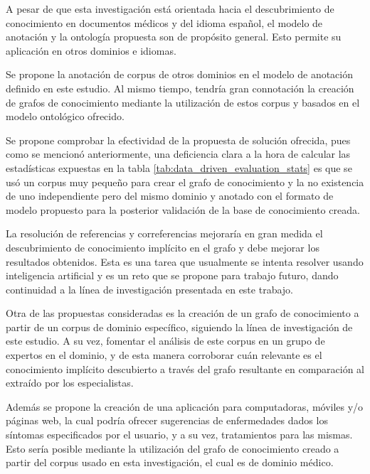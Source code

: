 \label{chapter:recommendations}

A pesar de que esta investigación está orientada hacia el descubrimiento de conocimiento en documentos médicos y del idioma español, el modelo de anotación y la ontología propuesta son de propósito general. Esto permite su aplicación en otros dominios e idiomas.

Se propone la anotación de corpus de otros dominios en el modelo de anotación definido en este estudio. Al mismo tiempo, tendría gran connotación la creación de grafos de conocimiento mediante la utilización de estos corpus y basados en el modelo ontológico ofrecido.

Se propone comprobar la efectividad de la propuesta de solución ofrecida, pues como se mencionó anteriormente, una deficiencia clara a la hora de calcular las estadísticas expuestas en la tabla \ref{tab:data_driven_evaluation_stats} es que se usó un corpus muy pequeño para crear el grafo de conocimiento y la no existencia de uno independiente pero del mismo dominio y anotado con el formato de modelo propuesto para la posterior validación de la base de conocimiento creada.

La resolución de referencias y correferencias mejoraría en gran medida el descubrimiento de conocimiento implícito en el grafo y debe mejorar los resultados obtenidos. Esta es una tarea que usualmente se intenta resolver usando inteligencia artificial y es un reto que se propone para trabajo futuro, dando continuidad a la línea de investigación presentada en este trabajo.

Otra de las propuestas consideradas es la creación de un grafo de conocimiento a partir de un corpus de dominio específico, siguiendo la línea de investigación de este estudio. A su vez, fomentar el análisis de este corpus en un grupo de expertos en el dominio, y de esta manera corroborar cuán relevante es el conocimiento implícito descubierto a través del grafo resultante en comparación al extraído por los especialistas.

Además se propone la creación de una aplicación para computadoras, móviles y/o páginas web, la cual podría ofrecer sugerencias de enfermedades dados los síntomas especificados por el usuario, y a su vez, tratamientos para las mismas. Esto sería posible mediante la utilización del grafo de conocimiento creado a partir del corpus usado en esta investigación, el cual es de dominio médico.